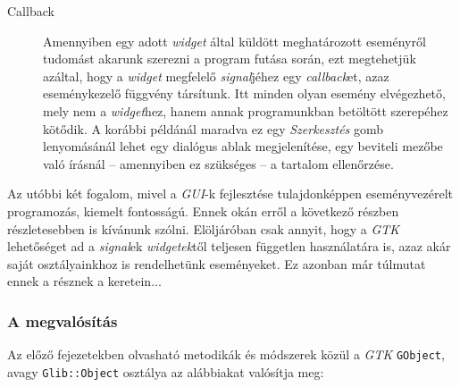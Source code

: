 \begin{description}
 \item[Callback] Amennyiben egy adott \textit{widget} által küldött meghatározott eseményről tudomást akarunk szerezni a program futása során, ezt megtehetjük azáltal, hogy a \textit{widget} megfelelő \textit{signal}jéhez egy \textit{callback}et, azaz eseménykezelő függvény társítunk. Itt minden olyan esemény elvégezhető, mely nem a \textit{widget}hez, hanem annak programunkban betöltött szerepéhez kötődik. A korábbi példánál maradva ez egy \textit{Szerkesztés} gomb lenyomásánál lehet egy dialógus ablak megjelenítése, egy beviteli mezőbe való írásnál -- amennyiben ez szükséges -- a tartalom ellenőrzése.
\end{description}

Az utóbbi két fogalom, mivel a \textit{GUI}-k fejlesztése tulajdonképpen eseményvezérelt programozás, kiemelt fontosságú. Ennek okán erről a következő részben részletesebben is kívánunk szólni. Elöljáróban csak annyit, hogy a \textit{GTK} lehetőséget ad a \textit{signal}ek \textit{widgetek}től teljesen független használatára is, azaz akár saját osztályainkhoz is rendelhetünk eseményeket. Ez azonban már túlmutat ennek a résznek a keretein...

\subsubsection{A megvalósítás}

Az előző fejezetekben olvasható metodikák és módszerek közül a \textit{GTK} \texttt{GObject}, avagy \texttt{Glib::Object} osztálya az alábbiakat valósítja meg:

